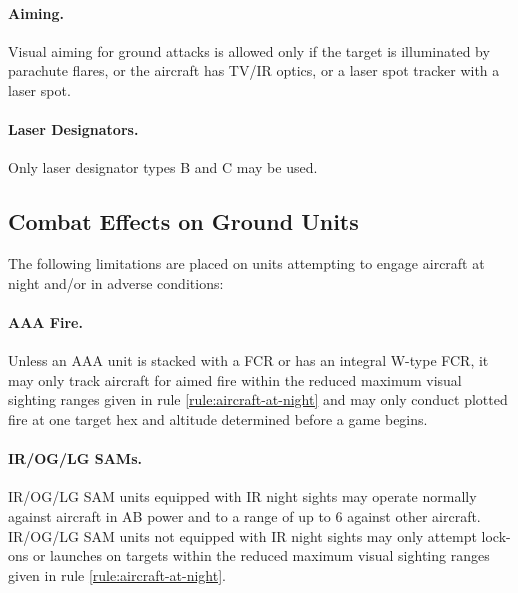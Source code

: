 \begin{advancedrules}
{\paragraph{Aiming.} Visual aiming for ground attacks is allowed only if the target is illuminated by parachute flares, or the aircraft has TV/IR optics, or a laser spot tracker with a laser spot.

\paragraph{Laser Designators.} Only laser designator types B and C may be used.

\subsection{Combat Effects on Ground Units}

The following limitations are placed on units attempting to engage aircraft at night and/or in adverse conditions:

\paragraph{AAA Fire.} Unless an AAA unit is stacked with a FCR or has an integral W-type FCR, it may only track aircraft for aimed fire within the reduced maximum visual sighting ranges given in rule \ref{rule:aircraft-at-night} and may only conduct plotted fire at one target hex and altitude determined before a game begins.

\paragraph{IR/OG/LG SAMs.} IR/OG/LG SAM units equipped with IR night sights may operate normally against aircraft in AB power and to a range of up to 6 against other aircraft. IR/OG/LG SAM units not equipped with IR night sights may only attempt lock-ons or launches on targets within the reduced maximum visual sighting ranges given in rule \ref{rule:aircraft-at-night}. 
}

\end{advancedrules}
